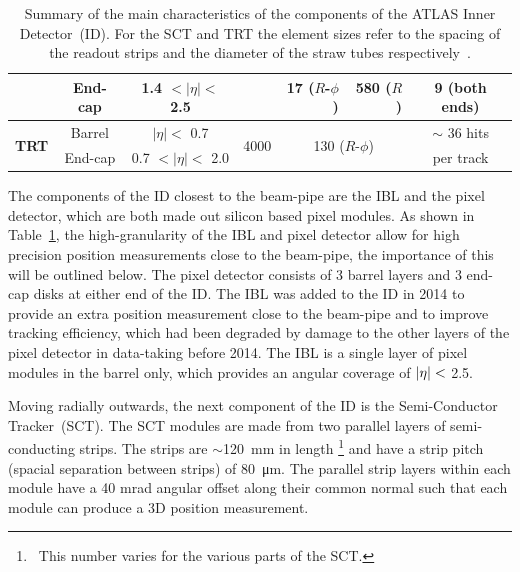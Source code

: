 {\begin{table}[!htb]
\begin{tabular}{|cc||c|c|rr|c|}
                         & End-cap   &        1.4  $\lt |\eta| \lt$  2.5    &                   &  17 ($R$-$\phi$)        & 580 ($R$)          & 9 (both ends)    \\ %
  \hline                                                                                                                                                
  \multirow{2}{*}{\textbf{TRT}}   & Barrel    & $|\eta| \lt$  0.7             & \multirow{2}{*}{4000}     & \multicolumn{2}{c|}{\multirow{2}{*}{130 ($R$-$\phi$)}}     & $\sim$ 36 hits    \\ %
                         & End-cap   &         0.7  $\lt |\eta| \lt$  2.0    &                  &                         &                  & per track        \\ %
  \hline
\end{tabular}
\caption[Summary of the main characteristics of the components of the ATLAS Inner Detector.]
        {\label{tab:det-ID}Summary of the main characteristics of the components of the ATLAS Inner Detector~(ID).
          For the SCT and TRT the element sizes refer to the spacing of the readout strips and the diameter of the straw tubes respectively~\cite{det-ATLAS_Exp,det-ID_table}.}
         \vspace{-1em}
\end{table}
}

The components of the ID closest to the beam-pipe are the IBL and the pixel detector,
which are both made out silicon based pixel modules.
As shown in Table~\ref{tab:det-ID}, the high-granularity of the IBL and pixel detector allow for high precision position measurements
close to the beam-pipe, the importance of this will be outlined below.
The pixel detector consists of 3 barrel layers and 3 end-cap disks at either end of the ID.
The IBL was added to the ID in 2014 to provide an extra position measurement close to the beam-pipe
and to improve tracking efficiency,
which had been degraded by damage to the other layers of the pixel detector in data-taking before 2014.
The IBL is a single layer of pixel modules in the barrel only, which provides an angular coverage of $|\eta|\nobreak<$ 2.5.

Moving radially outwards, the next component of the ID is the Semi-Conductor Tracker~(SCT).
The SCT modules are made from two parallel layers of semi-conducting strips.
The strips are $\sim$\SI{120}{\mm} in length \footnote{\ This number varies for the various parts of the SCT.}
and have a strip pitch (spacial separation between strips) of \SI{80}{\micro\metre}.
The parallel strip layers within each module have a 40 mrad angular offset along their common normal
such that each module can produce a 3D position measurement.

